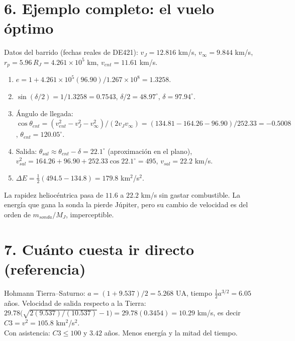 \documentclass[11pt,letterpaper]{article}
\newcommand{\vinf}{v_\infty}\newcommand{\RJ}{R_J}
\begin{document}
\section*{6. Ejemplo completo: el vuelo óptimo}
Datos del barrido (fechas reales de DE421): $v_J=12.816$ km/s, $\vinf=9.844$ km/s, $r_p=5.96\,\RJ=4.261\times10^5$ km, $v_{ent}=11.61$ km/s.
\begin{enumerate}[label=\arabic*.]
\item $e=1+4.261\times10^5(96.90)/1.267\times10^8=1.3258$.
\item $\sin(\delta/2)=1/1.3258=0.7543$, $\delta/2=48.97^\circ$, $\delta=97.94^\circ$.
\item Ángulo de llegada: $\cos\theta_{ent}=(v_{ent}^2-v_J^2-\vinf^2)/(2v_J\vinf)=(134.81-164.26-96.90)/252.33=-0.5008$, $\theta_{ent}=120.05^\circ$.
\item Salida: $\theta_{sal}\approx\theta_{ent}-\delta=22.1^\circ$ (aproximación en el plano), $v_{sal}^2=164.26+96.90+252.33\cos22.1^\circ=495$, $v_{sal}=22.2$ km/s.
\item $\Delta E=\tfrac12(494.5-134.8)=179.8$ km$^2$/s$^2$.
\end{enumerate}
La rapidez heliocéntrica pasa de $11.6$ a $22.2$ km/s sin gastar combustible. La energía que gana la sonda la pierde Júpiter, pero su cambio de velocidad es del orden de $m_{sonda}/M_J$, imperceptible.

\section*{7. Cuánto cuesta ir directo (referencia)}
Hohmann Tierra--Saturno: $a=(1+9.537)/2=5.268$ UA, tiempo $\tfrac12a^{3/2}=6.05$ años. Velocidad de salida respecto a la Tierra: $29.78\big(\sqrt{2(9.537)/(10.537)}-1\big)=29.78(0.3454)=10.29$ km/s, es decir $C3=v^2=105.8$ km$^2$/s$^2$.\\
Con asistencia: $C3\le100$ y $3.42$ años. Menos energía y la mitad del tiempo.
\end{document}
